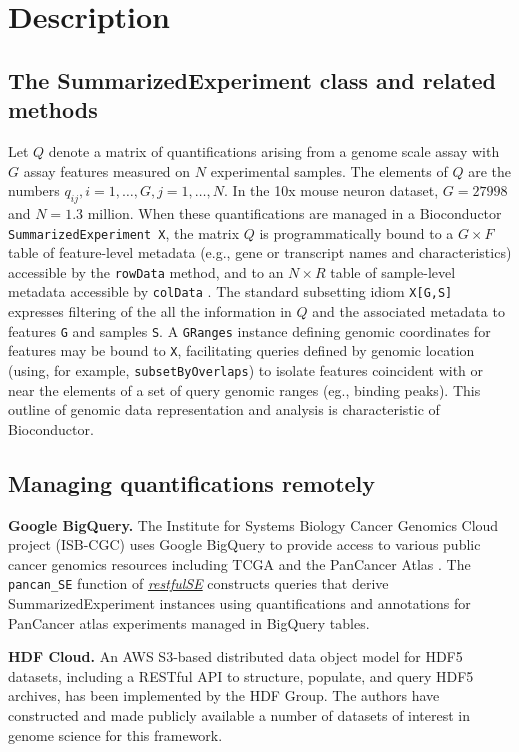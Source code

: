 \documentclass[applications]{gen-bioinformatics}
\newcommand{\Biocpackage}[1]{{\emph{\href{https://bioconductor.org/packages/3.8/#1}{#1}}}}
\begin{document}
\section*{Description}

\subsection*{The SummarizedExperiment class and related methods}

Let $Q$ denote a matrix of quantifications arising from a genome
scale assay with $G$ assay features measured on $N$ experimental
samples.  The elements of $Q$ are the numbers $q_{ij}, i = 1, \ldots, G,
j = 1, \ldots, N$.  In the 10x mouse neuron dataset, $G=27998$ and $N=1.3$ million.
When these quantifications are managed in a Bioconductor \texttt{SummarizedExperiment X}, the matrix $Q$ is programmatically bound to a $G \times F$
table of feature-level metadata (e.g., gene or transcript names and
characteristics) accessible by the \texttt{rowData} method, and to an $N \times R$ table of sample-level metadata accessible by \texttt{colData} \citep{Huber2015}. 
The standard subsetting idiom \texttt{X[G,S]} expresses filtering of 
the all the information in $Q$ and the associated metadata
to features \texttt{G} and samples \texttt{S}.  A \texttt{GRanges} 
instance \citep{Lawrence2013} defining genomic coordinates for features may be bound to \texttt{X},
facilitating queries defined by genomic location (using, for example, \texttt{subsetByOverlaps}) to isolate features
coincident with or near the elements of a set of query genomic ranges (eg., binding peaks).  This outline of genomic data representation
and analysis is characteristic of Bioconductor.

\subsection*{Managing quantifications remotely}

\noindent
\textbf{Google BigQuery.} The Institute for Systems Biology Cancer
Genomics Cloud project (ISB-CGC) \citep{ISBCGC} uses 
Google BigQuery to provide access to
various public cancer genomics resources including
TCGA and the PanCancer Atlas \citep{Hoadley2018}.
The \verb+pancan_SE+
function of \Biocpackage{restfulSE} constructs queries that derive
SummarizedExperiment instances using quantifications and annotations
for PanCancer atlas experiments
managed in BigQuery tables.  

\noindent
\textbf{HDF Cloud.}
An AWS S3-based distributed data object model for
HDF5 datasets, including a
RESTful API to structure, populate, and query HDF5 archives,  has been implemented by the HDF Group. The authors have constructed and
made publicly available a
number of datasets of interest in genome science for this framework.
\end{document}
